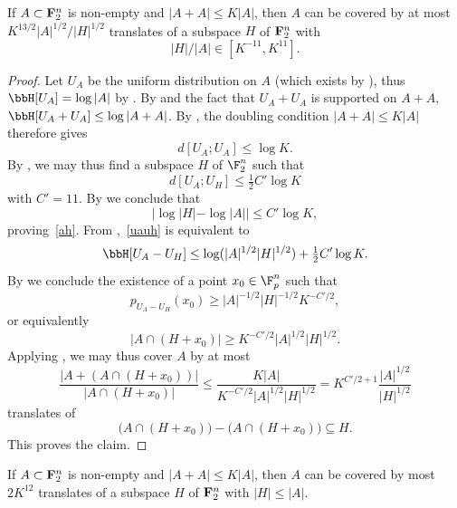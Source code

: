 \begin{lemma}\label{pfr_aux}
  \leanok If $A \subset {\bf F}_2^n$ is non-empty and
  $|A+A| \leq K|A|$, then $A$ can be covered by at most $K ^
  {13/2}|A|^{1/2}/|H|^{1/2}$ translates of a subspace $H$ of ${\bf F}_2^n$ with
  \begin{equation}
    \label{ah}
    |H|/|A| \in [K^{-11}, K^{11}].
  \end{equation}
  \end{lemma}

\begin{proof}
\leanok
  Let $U_A$ be the uniform distribution on $A$ (which exists by ), thus $\bbH[U_A] = \log |A|$ by . By  and the fact that $U_A + U_A$ is supported on $A + A$, $\bbH[U_A + U_A] \leq \log|A+A|$. By , the doubling condition $|A+A| \leq K|A|$ therefore gives
  \[d[U_A;U_A] \leq \log K.\]
  By , we may thus find a subspace $H$ of $\F_2^n$ such that
  \begin{equation}\label{uauh} d[U_A;U_H] \leq \tfrac{1}{2} C' \log K\end{equation}
  with $C' = 11$.
  By  we conclude that
  \begin{equation*}
    |\log |H| - \log |A|| \leq C' \log K,
  \end{equation*}
  proving~\eqref{ah}.
  From ,~\eqref{uauh} is equivalent to
  \[\bbH[U_A - U_H] \leq \log( |A|^{1/2} |H|^{1/2}) + \tfrac{1}{2} C' \log K.\]
  By  we conclude the existence of a point $x_0 \in \F_p^n$ such that
  \[p_{U_A-U_H}(x_0) \geq |A|^{-1/2} |H|^{-1/2} K^{-C'/2},\]
  or equivalently
  \[|A \cap (H + x_0)| \geq K^{-C'/2} |A|^{1/2} |H|^{1/2}.\]
  Applying , we may thus cover $A$ by at most
  \[\frac{|A + (A \cap (H+x_0))|}{|A \cap (H + x_0)|} \leq \frac{K|A|}{K^{-C'/2} |A|^{1/2} |H|^{1/2}} = K^{C'/2+1} \frac{|A|^{1/2}}{|H|^{1/2}}\]
  translates of
  \[\bigl(A \cap (H + x_0)\bigr) - \bigl(A \cap (H + x_0)\bigr) \subseteq H.\]
  This proves the claim.
\end{proof}


\begin{theorem}[PFR]\label{pfr}
\leanok
If $A \subset {\bf F}_2^n$ is non-empty and $|A+A| \leq K|A|$, then $A$ can be covered by most $2K^{12}$ translates of a subspace $H$ of ${\bf F}_2^n$ with $|H| \leq |A|$.
\end{theorem}

